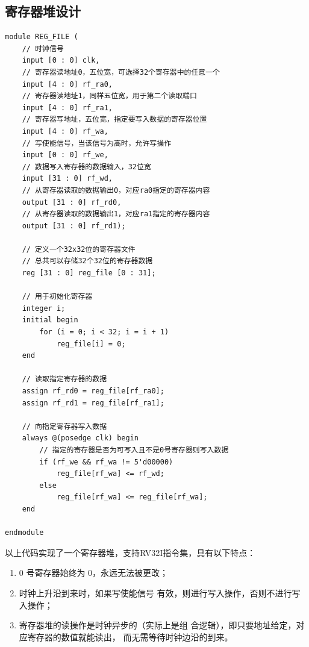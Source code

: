 \documentclass[12pt,a4paper]{ctexart}
\begin{document}
\subsection{寄存器堆设计}
\begin{lstlisting}[style=verilog]
module REG_FILE (
    // 时钟信号
    input [0 : 0] clk, 
    // 寄存器读地址0，五位宽，可选择32个寄存器中的任意一个
    input [4 : 0] rf_ra0, 
    // 寄存器读地址1，同样五位宽，用于第二个读取端口
    input [4 : 0] rf_ra1, 
    // 寄存器写地址，五位宽，指定要写入数据的寄存器位置
    input [4 : 0] rf_wa,
    // 写使能信号，当该信号为高时，允许写操作
    input [0 : 0] rf_we,
    // 数据写入寄存器的数据输入，32位宽
    input [31 : 0] rf_wd,
    // 从寄存器读取的数据输出0，对应ra0指定的寄存器内容
    output [31 : 0] rf_rd0,
    // 从寄存器读取的数据输出1，对应ra1指定的寄存器内容
    output [31 : 0] rf_rd1);

    // 定义一个32x32位的寄存器文件
    // 总共可以存储32个32位的寄存器数据
    reg [31 : 0] reg_file [0 : 31];

    // 用于初始化寄存器
    integer i;
    initial begin
        for (i = 0; i < 32; i = i + 1)
            reg_file[i] = 0;
    end

    // 读取指定寄存器的数据
    assign rf_rd0 = reg_file[rf_ra0];
    assign rf_rd1 = reg_file[rf_ra1];

    // 向指定寄存器写入数据
    always @(posedge clk) begin
        // 指定的寄存器是否为可写入且不是0号寄存器则写入数据
        if (rf_we && rf_wa != 5'd00000)
            reg_file[rf_wa] <= rf_wd;
        else
            reg_file[rf_wa] <= reg_file[rf_wa];
    end

endmodule

\end{lstlisting}
以上代码实现了一个寄存器堆，支持RV32I指令集，具有以下特点：
\begin{enumerate}
    \item 0 号寄存器始终为 0，永远无法被更改；
    \item 
    时钟上升沿到来时，如果写使能信号
    有效，则进行写入操作，否则不进行写入操作；
    \item
    寄存器堆的读操作是时钟异步的（实际上是组
    合逻辑），即只要地址给定，对应寄存器的数值就能读出，
    而无需等待时钟边沿的到来。
\end{enumerate}
\end{document}
